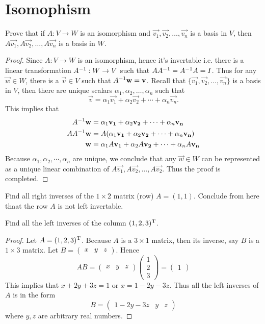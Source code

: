 \documentclass{article}
\def\by{\times}
\begin{document}
\section{Isomophism}
\begin{exercise}
  Prove that if $A:V\to W$ is an isomorphism and
  $\vec{v_1},\vec{v_2},\dots,\vec{v_n}$ is a basis in $V$,
  then $A\vec{v_1},A\vec{v_2},\dots,A\vec{v_n}$ is a basis in
  $W$.
\end{exercise}
\begin{proof}
  Since $A:V\to W$ is an isomorphism, hence it's invertable i.e. 
  there is a linear transformation $A^{-1}:W\to V$ such that
  $AA^{-1}=A^{-1} A=I$. Thus for any $\vec{w}\in W$, there is a
  $\vec{v}\in V$ such that $A^{-1}\mathbf{w}=\mathbf{v}$. Recall that
  $\{\vec{v_1},\vec{v_2},\dots,\vec{v_n}\}$ is a basis in $V$, then
  there are unique scalars $\alpha_1,\alpha_2,\dots,\alpha_n$ such that
  \[\vec{v}=\alpha_1\vec{v_1}+\alpha_2\vec{v_2}+\cdots+\alpha_n\vec{v_n}.\]
  This implies that
  \begin{align*}
    A^{-1}\mathbf{w}&=\alpha_1\mathbf{v_1}+\alpha_2\mathbf{v_2}+\cdots+\alpha_n\mathbf{v_n}\\
    AA^{-1}\mathbf{w}&=A(\alpha_1\mathbf{v_1}+\alpha_2\mathbf{v_2}+\cdots+\alpha_n\mathbf{v_n})\\
    \mathbf{w}&=\alpha_1A\mathbf{v_1}+\alpha_2A\mathbf{v_2}+\cdots+\alpha_nA\mathbf{v_n}\\
  \end{align*}
  Because $\alpha_1,\alpha_2,\cdots,\alpha_n$ are unique, we conclude
  that any $\vec{w}\in W$ can be represented as a unique linear combination
  of $A\vec{v_1},A\vec{v_2},\dots,A\vec{v_2}$. Thus the proof is completed.
\end{proof}
\begin{exercise}
  Find all right inverses of the $1\by 2$ matrix (row) $A=(1,1)$.
  Conclude from here thaat the row $A$ is not left invertable.
\end{exercise}
\begin{exercise}
  Find all the left inverses of the column $(1,2,3)^\mathrm{T}$.
\end{exercise}
\begin{proof}
  Let $A=(1,2,3)^\mathrm{T}$. Because $A$ is a $3\by 1$ matrix, then its
  inverse, say $B$ is a $1\by 3$ matrix. Let 
  $B= \begin{pmatrix} x&y&z \end{pmatrix} $. Hence
  \[AB=
    \begin{pmatrix}
      x&y&z
    \end{pmatrix}
    \begin{pmatrix}
      1\\2\\3
    \end{pmatrix}=
    \begin{pmatrix}
      1
    \end{pmatrix}
  \]
  This implies that $x+2y+3z=1$ or $x=1-2y-3z$. Thus all the left
  inverses of $A$ is in the form
  \[B=
    \begin{pmatrix}
      1-2y-3z & y&z
    \end{pmatrix}
  \]
  where $y,z$ are arbitrary real numbers.
\end{proof}
\end{document}
